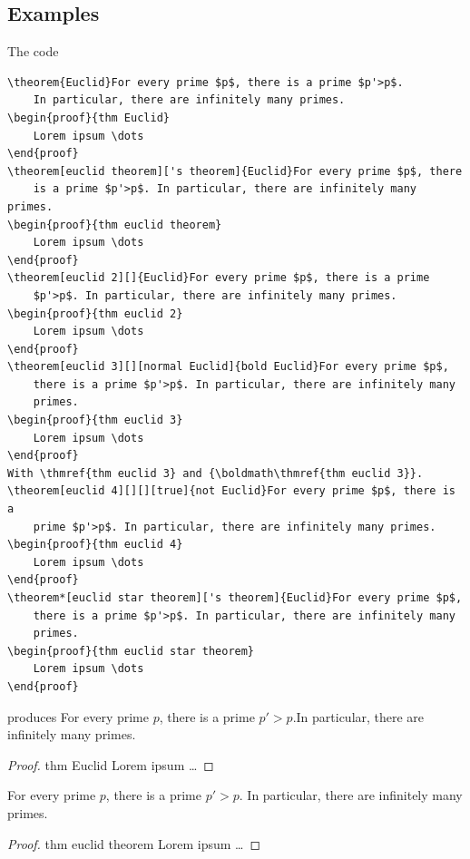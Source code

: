 \documentclass[12pt, babellanguage=british, titlespace, defaulttheorems]{altarticle}
\begin{document}
\subsection{Examples}
The code
\begin{verbatim}
\theorem{Euclid}For every prime $p$, there is a prime $p'>p$.
    In particular, there are infinitely many primes.
\begin{proof}{thm Euclid}
    Lorem ipsum \dots
\end{proof}
\theorem[euclid theorem]['s theorem]{Euclid}For every prime $p$, there
    is a prime $p'>p$. In particular, there are infinitely many primes.
\begin{proof}{thm euclid theorem}
    Lorem ipsum \dots
\end{proof}
\theorem[euclid 2][]{Euclid}For every prime $p$, there is a prime
    $p'>p$. In particular, there are infinitely many primes.
\begin{proof}{thm euclid 2}
    Lorem ipsum \dots
\end{proof}
\theorem[euclid 3][][normal Euclid]{bold Euclid}For every prime $p$,
    there is a prime $p'>p$. In particular, there are infinitely many
    primes.
\begin{proof}{thm euclid 3}
    Lorem ipsum \dots
\end{proof}
With \thmref{thm euclid 3} and {\boldmath\thmref{thm euclid 3}}.
\theorem[euclid 4][][][true]{not Euclid}For every prime $p$, there is a
    prime $p'>p$. In particular, there are infinitely many primes.
\begin{proof}{thm euclid 4}
    Lorem ipsum \dots
\end{proof}
\theorem*[euclid star theorem]['s theorem]{Euclid}For every prime $p$,
    there is a prime $p'>p$. In particular, there are infinitely many
    primes.
\begin{proof}{thm euclid star theorem}
    Lorem ipsum \dots
\end{proof}
\end{verbatim}
produces
For every prime $p$, there is a prime $p'>p$.In particular, there are infinitely many primes.
\begin{proof}{thm Euclid}
    Lorem ipsum \dots
\end{proof}
For every prime $p$, there is a prime $p'>p$. In particular, there are infinitely many primes.
\begin{proof}{thm euclid theorem}
    Lorem ipsum \dots
\end{proof}
\end{document}

